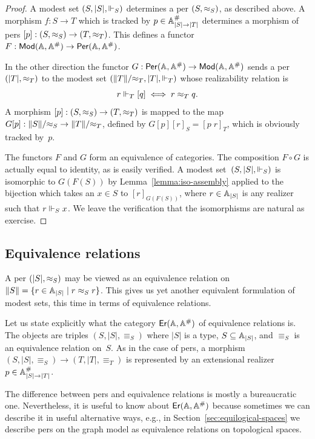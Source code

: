 \begin{proof}
  A modest set $(S, |S|, {\Vdash_{S}})$ determines a per $(S, {\approx_S})$,
  as described above. A morphism $f : S \to T$ which is tracked by $p
  \in \mathbb{A}^{\#}_{|S| \to |T|}$ determines a morphism of pers $[p] : (S,
  {\approx_S}) \to (T, {\approx_T})$. This defines a functor $F : \mathsf{Mod}(\mathbb{A},
    \mathbb{A}^{\#}) \to \mathsf{Per}(\mathbb{A}, \mathbb{A}^{\#})$.

  In the other direction the functor $G : \mathsf{Per}(\mathbb{A}, \mathbb{A}^{\#}) \to
  \mathsf{Mod}(\mathbb{A}, \mathbb{A}^{\#})$ sends a per $(|T|, {\approx_T})$ to the modest set
  $(\|T\|/{\approx_T}, |T|, {\Vdash_T})$ whose realizability relation is
  \begin{equation*}
    r \Vdash_T [q] \iff r \approx_T q.
  \end{equation*}
  A morphism $[p] : (S, {\approx_S}) \to (T, {\approx_T})$ is mapped to the
  map $G [p] : \|S\|/{\approx_S} \to \|T\|/{\approx_T}$, defined by $G [p]
  [r]_S = [p\;r]_T$, which is obviously tracked by~$p$.

  The functors $F$ and $G$ form an equivalence of categories. The
  composition $F \circ G$ is actually equal to identity, as is easily
  verified. A modest set~$(S, |S|, {\Vdash_{S}})$ is isomorphic to
  $G(F(S))$ by Lemma~\ref{lemma:iso-assembly} applied to the bijection
  which takes an $x \in S$ to $[r]_{G(F(S))}$, where $r \in \mathbb{A}_{|S|}$
  is any realizer such that $r \Vdash_S x$. We leave the verification
  that the isomorphisms are natural as exercise.
\end{proof}


\subsection{Equivalence relations}
\label{sec:ers}

A per $(|S|, {\approx_S})$ may be viewed as an equivalence relation on
$\|S\| = \{r \in \mathbb{A}_{|S|} \mid r \approx_S r\}$. This gives us yet
another equivalent formulation of modest sets, this time in terms of
equivalence relations.

Let us state explicitly what the category $\mathsf{Er}(\mathbb{A}, \mathbb{A}^{\#})$ of
equivalence relations is. The objects are triples $(S, |S|,
{\equiv_S})$ where $|S|$ is a type, $S \subseteq \mathbb{A}_{|S|}$, and
$\equiv_S$ is an equivalence relation on~$S$. As in the case of pers,
a morphism $(S, |S|, {\equiv_S}) \to (T, |T|, {\equiv_T})$ is
represented by an extensional realizer $p \in \mathbb{A}^{\#}_{|S| \to |T|}$.

The difference between pers and equivalence relations is mostly a
bureaucratic one. Nevertheless, it is useful to know about $\mathsf{Er}(\mathbb{A},
  \mathbb{A}^{\#})$ because sometimes we can describe it in useful
alternative ways, e.g., in Section~\ref{sec:equilogical-spaces} we
describe pers on the graph model as equivalence relations on
topological spaces.


